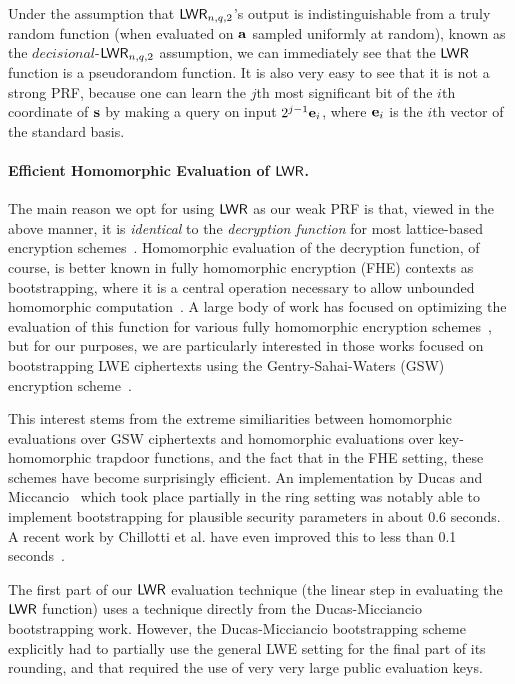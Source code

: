 Under the assumption that $\mathsf{LWR}_{n,q,2}$'s output is indistinguishable from a truly random function (when evaluated on $\mathbf{a}$ sampled uniformly at random), known as the $decisional$-$\mathsf{LWR}_{n,q,2}$ assumption, we can immediately see that the $\mathsf{LWR}$ function is a pseudorandom function. It is also very easy to see that it is not a strong PRF, because one can learn the $j$th most significant bit of the $i$th coordinate of $\mathbf{s}$ by making a query on input $2^{j-1}\mathbf{e}_i$, where $\mathbf{e}_i$ is the $i$th vector of the standard basis. 


\paragraph{Efficient Homomorphic Evaluation of $\mathsf{LWR}$.}
The main reason we opt for using $\mathsf{LWR}$ as our weak PRF is that, viewed in the above manner, it is \emph{identical} to the \emph{decryption function} for most lattice-based encryption schemes~\cite{DBLP:journals/jacm/Regev09}. Homomorphic evaluation of the decryption function, of course, is better known in fully homomorphic encryption (FHE) contexts as bootstrapping, where it is a central operation necessary to allow unbounded homomorphic computation~\cite{GentryThesis09}. A large body of work has focused on optimizing the evaluation of this function for various fully homomorphic encryption schemes~\cite{DBLP:conf/pkc/GentryHS12,DBLP:conf/crypto/Alperin-SheriffP13,DBLP:conf/pkc/OrsiniPS15,DBLP:conf/eurocrypt/HaleviS15}, but for our purposes, we are particularly interested in those works focused on bootstrapping LWE ciphertexts using the Gentry-Sahai-Waters (GSW) ~\cite{DBLP:conf/crypto/GentrySW13} encryption scheme~\cite{DBLP:conf/crypto/Alperin-SheriffP14,DBLP:conf/pkc/HiromasaAO15,DBLP:conf/eurocrypt/DucasM15,cryptoeprint:2016:870}.

This interest stems from the extreme similiarities between homomorphic evaluations over GSW ciphertexts and homomorphic evaluations over key-homomorphic trapdoor functions, and the fact that in the FHE setting, these schemes have become surprisingly efficient. An implementation by Ducas and Miccancio~\cite{DBLP:conf/eurocrypt/DucasM15} which took place partially in the ring setting was notably able to implement bootstrapping for plausible security parameters in about $0.6$ seconds. A recent work by Chillotti et al. have even improved this to less than 0.1 seconds~\cite{DBLP:conf/asiacrypt/ChillottiGGI16}.

The first part of our $\mathsf{LWR}$ evaluation technique (the linear step in evaluating the $\mathsf{LWR}$ function) uses a technique directly from the Ducas-Micciancio bootstrapping work. However, the Ducas-Micciancio bootstrapping scheme explicitly had to partially use the general LWE setting for the final part of its rounding, and that required the use of very very large public evaluation keys.

